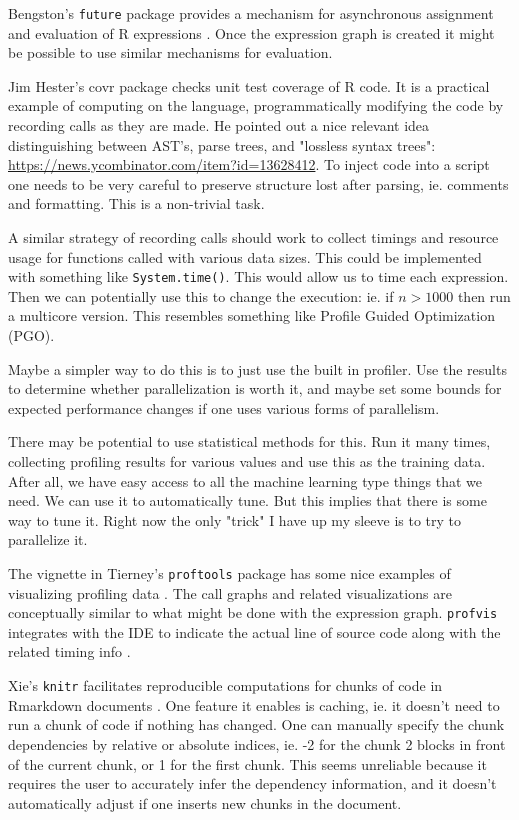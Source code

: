 \documentclass[12pt]{article}
\begin{document}
Bengston's \texttt{future} package provides a mechanism for
asynchronous assignment and evaluation of R expressions \cite{R-future}. Once the
expression graph is created it might be possible to use similar mechanisms
for evaluation.

Jim Hester's covr package \cite{R-covr} checks unit test coverage of R
code. It is a practical example of computing on the language,
programmatically modifying the code by recording calls as they are made.
He pointed out a nice relevant idea distinguishing between AST's, parse
trees, and "lossless syntax trees":
\url{https://news.ycombinator.com/item?id=13628412}. To inject code into a
script one needs to be very
careful to preserve structure lost after parsing, ie.
comments and formatting. This is a non-trivial task.

A similar strategy of recording calls should work to collect timings and
resource usage for functions called with various data sizes. This could be
implemented with something like \texttt{System.time()}. This would allow us
to time each expression. Then we can potentially use this to change the
execution: ie. if $n > 1000$ then run a multicore version. This resembles
something like Profile Guided Optimization (PGO). 

Maybe a simpler way to do this is to just use the built in profiler. Use
the results to determine whether parallelization is worth it, and maybe set
some bounds for expected performance changes if one uses various forms of
parallelism. 

There may be potential to use statistical methods for this.
Run it many times, collecting profiling results for various values and use
this as the training data. After all, we have easy access to all the
machine learning type things that we need. We can use it to automatically
tune. But this implies that there is some way to tune it. Right now the
only "trick" I have up my sleeve is to try to parallelize it.

The vignette in Tierney's \texttt{proftools} package has some nice examples
of visualizing profiling data \cite{R-proftools}. The call graphs and related visualizations
are conceptually similar to what might be done with the expression graph.
\texttt{profvis} integrates with the IDE to indicate the actual
line of source code along with the related timing info \cite{R-profvis}.

Xie's \texttt{knitr} facilitates reproducible computations for
chunks of code in Rmarkdown documents \cite{R-knitr}. One feature it enables is caching,
ie. it doesn't need to run a chunk of code if nothing has changed. One can
manually specify the chunk dependencies by relative or absolute indices,
ie. -2 for the chunk 2 blocks in front of the current chunk, or 1 for the
first chunk. This seems unreliable because it requires the user to
accurately infer the dependency information, and it doesn't automatically
adjust if one inserts new chunks in the document.
\end{document}
